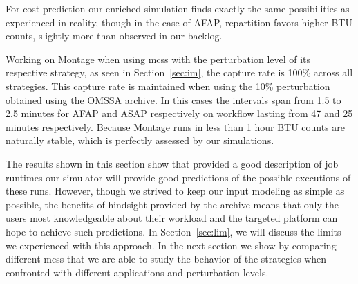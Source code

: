 \documentclass[10pt,conference,compsocconf]{IEEEtran}
\begin{document}
For cost prediction our enriched  simulation finds exactly the same possibilities
as experienced in reality, though in  the case of AFAP, repartition favors higher
BTU counts, slightly more than observed in our backlog.

Working on Montage when using \acp{mcs} with the perturbation level of its
respective strategy, as seen in Section~\ref{sec:im}, the capture rate is 100\%
across all strategies. This capture rate is maintained when using the 10\%
perturbation obtained using the OMSSA archive. In this cases the intervals span
from 1.5 to 2.5 minutes for AFAP and ASAP respectively on workflow lasting from
47 and 25 minutes respectively. Because Montage runs in less than 1 hour BTU 
counts are naturally stable, which is perfectly assessed by our simulations.

The results shown in  this section show that provided a  good description of job
runtimes our simulator will provide  good predictions of the possible executions
of these runs. However, though we strived to keep our input modeling as simple
as possible, the  benefits of hindsight provided by the  archive means that only
the users most knowledgeable about their  workload and the targeted platform can
hope to achieve such predictions.  In Section~\ref{sec:lim}, we will discuss the
limits we experienced with this approach. In the next section we show by comparing
different \acp{mcs}  that we are able  to study the behavior  of the strategies
when confronted with different applications and perturbation levels.
\end{document}
